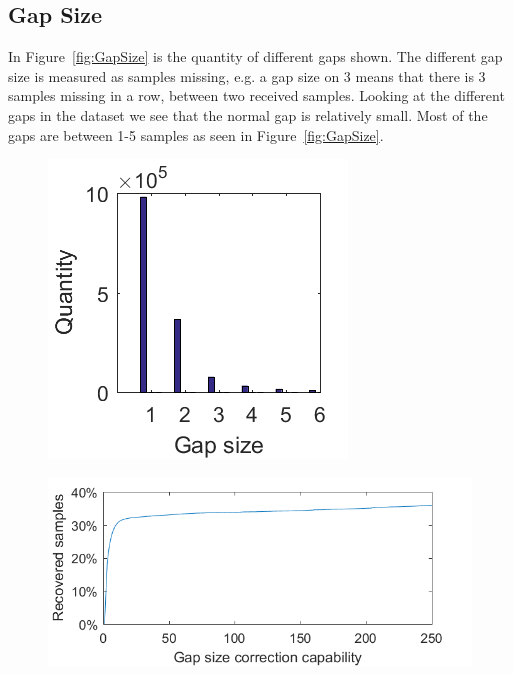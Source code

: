 \subsection{Gap Size}
In Figure~\ref{fig:GapSize} is the quantity of different gaps shown. The different gap size is measured as samples missing, e.g. a gap size on 3 means that there is 3 samples missing in a row, between two received samples. Looking at the different gaps in the dataset we see that the normal gap is relatively small. Most of the gaps are between 1-5 samples as seen in Figure~\ref{fig:GapSize}.

\begin{figure}[H]
\centering
\begin{minipage}{.3\textwidth}
  \centering
  \includegraphics[width=1\linewidth]{billeder/GapInfo1.png}
  \label{fig:GapSize}
\end{minipage}%
\begin{minipage}{.8\textwidth}
  \centering
  \includegraphics[width=0.8\linewidth]{billeder/CorrectionCapability.png}
  \label{fig:GapCorrect}
\end{minipage}
\end{figure}

